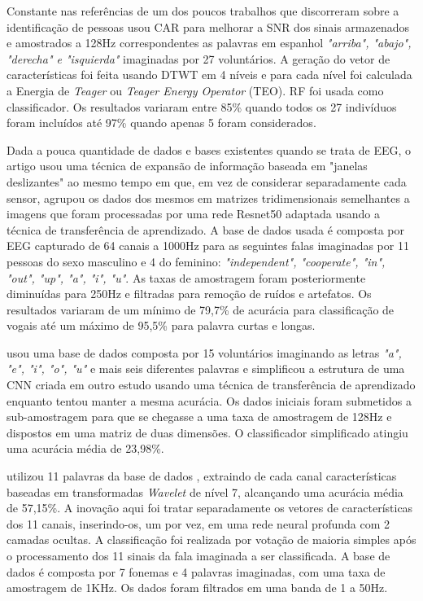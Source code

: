 			\par Constante nas referências de \cite{Hernandez-Del-ToroTonatiuh2021TaEB} um dos poucos trabalhos que discorreram sobre a identificação de pessoas \cite{MOCTEZUMA2019201} usou CAR para melhorar a SNR dos sinais armazenados e amostrados a 128Hz correspondentes as palavras em espanhol \textit{"arriba", "abajo", "derecha" e "isquierda"} imaginadas por 27 voluntários. A geração do vetor de características foi feita usando DTWT em 4 níveis e para cada nível foi calculada a Energia de \textit{Teager} ou \textit{Teager Energy Operator} (TEO). RF foi usada como classificador. Os resultados variaram entre 85\% quando todos os 27 indivíduos foram incluídos até 97\% quando apenas 5 foram considerados.
			
			\par Dada a pouca quantidade de dados e bases existentes quando se trata de EEG, o artigo \cite{PanachakelJerrinRamakrishnan} usou uma técnica de expansão de informação baseada em "janelas deslizantes" ao mesmo tempo em que, em vez de considerar separadamente cada sensor, agrupou os dados dos mesmos em matrizes tridimensionais semelhantes a imagens que foram processadas por uma rede Resnet50 \cite{DBLP:journals/corr/HeZRS15} adaptada usando a técnica de transferência de aprendizado. A base de dados usada \cite{nguyen2018inferring} é composta por EEG capturado de 64 canais a 1000Hz para as seguintes falas imaginadas por 11 pessoas do sexo masculino e 4 do feminino: \textit{"independent", "cooperate", "in", "out", "up", "a", "i", "u"}. As taxas de amostragem foram posteriormente diminuídas para 250Hz e filtradas para remoção de ruídos e artefatos. Os resultados variaram de um mínimo de 79,7\% de acurácia para classificação de vogais até um máximo de 95,5\% para palavra curtas e longas.
			
			\par \cite{tamm2020classification} usou uma base de dados composta por 15 voluntários imaginando as letras \textit{"a", "e", "i", "o", "u"} e mais seis diferentes palavras \cite{10.1117/12.2255697} e simplificou a estrutura de uma CNN criada em outro estudo usando uma técnica de transferência de aprendizado enquanto tentou manter a mesma acurácia. Os dados iniciais foram submetidos a sub-amostragem para que se chegasse a uma taxa de amostragem de 128Hz e dispostos em uma matriz de duas dimensões. O classificador simplificado atingiu uma acurácia média de 23,98\%.
			
			\par \cite{Panachakel_2019} utilizou 11 palavras da base de dados \cite{7178118}, extraindo de cada canal características baseadas em transformadas \textit{Wavelet} de nível 7, alcançando uma acurácia média de 57,15\%. A inovação aqui foi tratar separadamente os vetores de características dos 11 canais, inserindo-os, um por vez, em uma rede neural profunda com 2 camadas ocultas. A classificação foi realizada por votação de maioria simples após o processamento dos 11 sinais da fala imaginada a ser classificada. A base de dados é composta por 7 fonemas e 4 palavras imaginadas, com uma taxa de amostragem de 1KHz. Os dados foram filtrados em uma banda de 1 a 50Hz.
			
